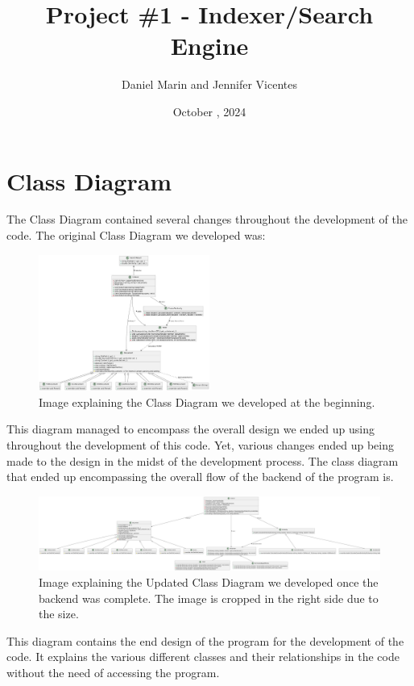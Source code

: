 \documentclass{article}
\title{Project \#1 - Indexer/Search Engine}
\author{Daniel Marin and Jennifer Vicentes}
\date{October , 2024}
\begin{document}
\maketitle
\tableofcontents
\section{Class Diagram}
The Class Diagram contained several changes throughout the development of the code. The original Class Diagram we developed was:
\begin{figure}[H]
    \centering
    \includegraphics[width=0.5\textwidth]{Image_OriginalClassDiagram.jpeg}
    \caption{Image explaining the Class Diagram we developed at the beginning.}
    \label{fig:OriginalClassDiagram}
\end{figure}
This diagram managed to encompass the overall design we ended up using throughout the development of this code. Yet, various changes ended up being made to the design in the midst of the development process. The class diagram that ended up encompassing the overall flow of the backend of the program is. 
\begin{figure}[H]
    \centering
    \includegraphics[width=\textwidth]{Image_UpdatedClassDiagram.png}
    \caption{Image explaining the Updated Class Diagram we developed once the backend was complete. The image is cropped in the right side due to the size.}
    \label{fig:UpdatedClassDiagram}
\end{figure}
This diagram contains the end design of the program for the development of the code. It explains the various different classes and their relationships in the code without the need of accessing the program.
\end{document}
